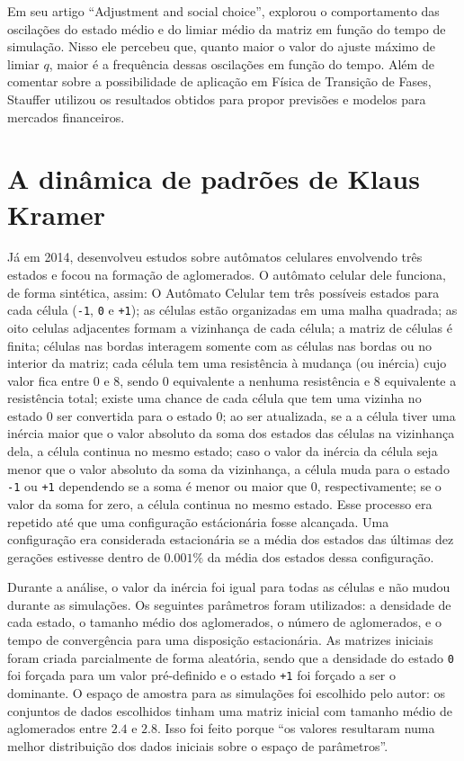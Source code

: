 \documentclass[
	12pt,				%
	openright,			%
	twoside,			%
	a4paper,			%
	english,			%
	french,				%
	spanish,			%
	brazil				%
	]{abntex2}
\begin{document}
Em seu artigo ``Adjustment and social choice'',  explorou o comportamento das oscilações do estado médio e do limiar médio da matriz em função do tempo de simulação. Nisso ele percebeu que, quanto maior o valor do ajuste máximo de limiar $q$, maior é a frequência dessas oscilações em função do tempo. Além de comentar sobre a possibilidade de aplicação em Física de Transição de Fases, Stauffer utilizou os resultados obtidos para propor previsões e modelos para mercados financeiros.

\section*{A dinâmica de padrões de Klaus Kramer}

Já em 2014,  desenvolveu estudos sobre autômatos celulares envolvendo três estados e focou na formação de aglomerados. O autômato celular dele funciona, de forma sintética, assim: O Autômato Celular tem três possíveis estados para cada célula (\texttt{-1}, \texttt{0} e \texttt{+1}); as células estão organizadas em uma malha quadrada; as oito celulas adjacentes formam a vizinhança de cada célula; a matriz de células é finita; células nas bordas interagem somente com as células nas bordas ou no interior da matriz; cada célula tem uma resistência à mudança (ou inércia) cujo valor fica entre $0$ e $8$, sendo $0$ equivalente a nenhuma resistência e $8$ equivalente a resistência total; existe uma chance de cada célula que tem uma vizinha no estado $0$ ser convertida para o estado $0$; ao ser atualizada, se a a célula tiver uma inércia maior que o valor absoluto da soma dos estados das células na vizinhança dela, a célula continua no mesmo estado; caso o valor da inércia da célula seja menor que o valor absoluto da soma da vizinhança, a célula muda para o estado \texttt{-1} ou \texttt{+1} dependendo se a soma é menor ou maior que $0$, respectivamente; se o valor da soma for zero, a célula continua no mesmo estado. Esse processo era repetido até que uma configuração estácionária fosse alcançada. Uma configuração era considerada estacionária se a média dos estados das últimas dez gerações estivesse dentro de $0.001\%$ da média dos estados dessa configuração.

Durante a análise, o valor da inércia foi igual para todas as células e não mudou durante as simulações. Os seguintes parâmetros foram utilizados: a densidade de cada estado, o tamanho médio dos aglomerados, o número de aglomerados, e o tempo de convergência para uma disposição estacionária. As matrizes iniciais foram criada parcialmente de forma aleatória, sendo que a densidade do estado \texttt{0} foi forçada para um valor pré-definido e o estado \texttt{+1} foi forçado a ser o dominante. O espaço de amostra para as simulações foi escolhido pelo autor: os conjuntos de dados escolhidos tinham uma matriz inicial com tamanho médio de aglomerados entre $2.4$ e $2.8$. Isso foi feito porque ``os valores resultaram numa melhor distribuição dos dados iniciais sobre o espaço de parâmetros''.
\end{document}
